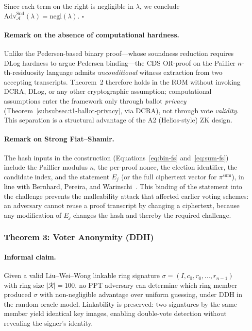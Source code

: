 Since each term on the right is negligible in $\lambda$, we conclude $\mathrm{Adv}^{\mathrm{Snd}}_{\mathcal{A}}(\lambda) = \mathrm{negl}(\lambda)$. \hfill $\square$

\paragraph{Remark on the absence of computational hardness.} Unlike the Pedersen-based binary proof---whose soundness reduction requires DLog hardness to argue Pedersen binding---the CDS OR-proof on the Paillier $n$-th-residuosity language admits \emph{unconditional} witness extraction from two accepting transcripts. Theorem~2 therefore holds in the ROM without invoking DCRA, DLog, or any other cryptographic assumption; computational assumptions enter the framework only through ballot \emph{privacy} (Theorem~\ref{subsubsec:t1-ballot-privacy}, via DCRA), not through vote \emph{validity}. This separation is a structural advantage of the A2 (Helios-style) ZK design.

\paragraph{Remark on Strong Fiat--Shamir.} The hash inputs in the construction (Equations~\eqref{eq:bin-fs} and~\eqref{eq:sum-fs}) include the Paillier modulus $n$, the per-proof nonce, the election identifier, the candidate index, and the statement $E_j$ (or the full ciphertext vector for $\pi^{\text{sum}}$), in line with Bernhard, Pereira, and Warinschi~\cite{bernhard2012}. This binding of the statement into the challenge prevents the malleability attack that affected earlier voting schemes: an adversary cannot reuse a proof transcript by changing a ciphertext, because any modification of $E_j$ changes the hash and thereby the required challenge.

\subsubsection{Theorem 3: Voter Anonymity (DDH)}
\label{subsubsec:t3-voter-anonymity}

\paragraph{Informal claim.} Given a valid Liu--Wei--Wong linkable ring signature $\sigma = (I, c_0, r_0, \ldots, r_{n-1})$ with ring size $|\mathcal{R}| = 100$, no PPT adversary can determine which ring member produced $\sigma$ with non-negligible advantage over uniform guessing, under DDH in the random-oracle model. Linkability is preserved: two signatures by the same member yield identical key images, enabling double-vote detection without revealing the signer's identity.

